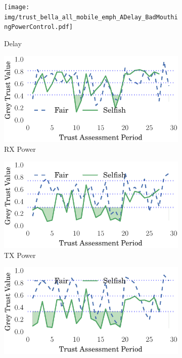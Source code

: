 \documentclass[runningheads,a4paper]{llncs}
\begin{document}
\begin{figure}
\begin{subfigure}{0.32\textwidth}
  \centering
  \texttt{[image: img/trust\_bella\_all\_mobile\_emph\_ADelay\_BadMouthingPowerControl.pdf]}
  \caption{Delay}
  \label{fig:all_mobile_badmouthing_delay}
\end{subfigure}
\begin{subfigure}{0.32\textwidth}
\centering
  \includegraphics[width=.95\linewidth]{img/trust_bella_all_mobile_emph_ARXP_BadMouthingPowerControl.pdf}
  \caption{RX Power}
  \label{fig:all_mobile_badmouthing_rxp}
\end{subfigure}
\begin{subfigure}{0.32\textwidth}
\centering
  \includegraphics[width=.95\linewidth]{img/trust_bella_all_mobile_emph_ATXP_BadMouthingPowerControl.pdf}
  \caption{TX Power}
  \label{fig:all_mobile_badmouthing_txp}
\end{subfigure}
\begin{subfigure}{0.32\textwidth}
\centering
  \includegraphics[width=.95\linewidth]{img/trust_bella_all_mobile_emph_RXThroughput_BadMouthingPowerControl.pdf}

\end{subfigure}
\end{figure}
\end{document}
